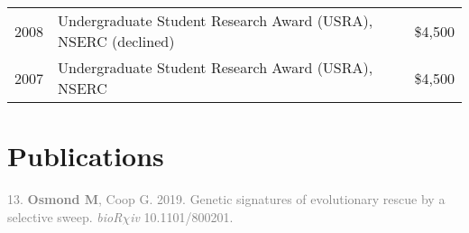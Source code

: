 \documentclass[12pt]{article}
\begin{document}
\begin{tabular}{llr}
  2008 & Undergraduate Student Research Award (USRA), NSERC (declined) & \$4,500\\
  2007 & Undergraduate Student Research Award (USRA), NSERC & \$4,500\\
\end{tabular}

\newpage
\section*{Publications}

%
%

\noindent\hspace{.1cm}\textcolor{gray}{13. \textbf{Osmond M}, Coop G. 2019. Genetic signatures of evolutionary rescue by a selective sweep. \textit{bioR$\chi$iv} 10.1101/800201.}
\end{document}
